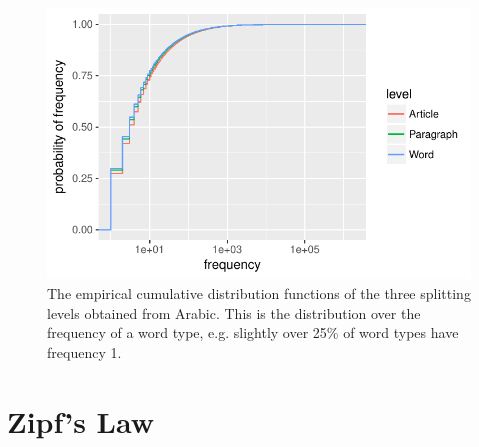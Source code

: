 \documentclass{article}
\begin{document}
\begin{figure}
	\centering
	\includegraphics[scale=0.9]{AR-ecdf.pdf}
	\caption{The empirical cumulative distribution functions of the three splitting levels obtained from Arabic. This is the distribution over the frequency of a word type, e.g. slightly over 25\% of word types have frequency 1.}
	\label{ECDFS}
\end{figure}





\section{Zipf's Law}
\end{document}
